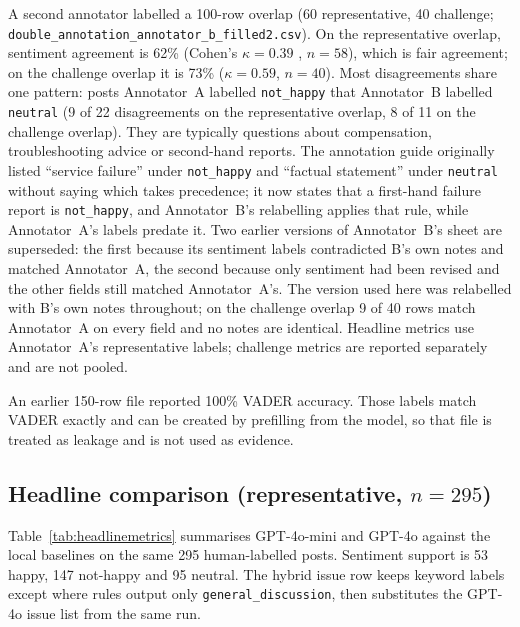 \documentclass[11pt,a4paper]{article}
\begin{document}
A second annotator labelled a 100-row overlap (60 representative, 40 challenge; \texttt{double\_annotation\_annotator\_b\_filled2.csv}). On the representative overlap, sentiment agreement is 62\% (Cohen's $\kappa=0.39$ \cite{cohen1960kappa}, $n=58$), which is fair agreement; on the challenge overlap it is 73\% ($\kappa=0.59$, $n=40$). Most disagreements share one pattern: posts Annotator~A labelled \texttt{not\_happy} that Annotator~B labelled \texttt{neutral} (9 of 22 disagreements on the representative overlap, 8 of 11 on the challenge overlap). They are typically questions about compensation, troubleshooting advice or second-hand reports. The annotation guide originally listed ``service failure'' under \texttt{not\_happy} and ``factual statement'' under \texttt{neutral} without saying which takes precedence; it now states that a first-hand failure report is \texttt{not\_happy}, and Annotator~B's relabelling applies that rule, while Annotator~A's labels predate it. Two earlier versions of Annotator~B's sheet are superseded: the first because its sentiment labels contradicted B's own notes and matched Annotator~A, the second because only sentiment had been revised and the other fields still matched Annotator~A's. The version used here was relabelled with B's own notes throughout; on the challenge overlap 9 of 40 rows match Annotator~A on every field and no notes are identical. Headline metrics use Annotator~A's representative labels; challenge metrics are reported separately and are not pooled.

An earlier 150-row file reported 100\% VADER accuracy. Those labels match VADER exactly and can be created by prefilling from the model, so that file is treated as leakage and is not used as evidence.

\subsection{Headline comparison (representative, $n=295$)}

Table~\ref{tab:headlinemetrics} summarises GPT-4o-mini and GPT-4o against the local baselines on the same 295 human-labelled posts. Sentiment support is 53 happy, 147 not-happy and 95 neutral. The hybrid issue row keeps keyword labels except where rules output only \texttt{general\_discussion}, then substitutes the GPT-4o issue list from the same run.
\end{document}
